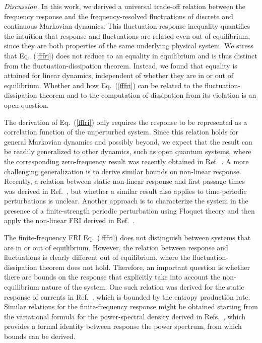 \documentclass[aps,pre,twocolumn,superscriptaddress,notitlepage]{revtex4-2}
\renewcommand{\eqref}[1]{Eq.~(\ref{#1})}
\begin{document}
\textit{Discussion.}
In this work, we derived a universal trade-off relation between the frequency response and the frequency-resolved fluctuations of discrete and continuous Markovian dynamics.
This fluctuation-response inequality quantifies the intuition that response and fluctuations are related even out of equilibrium, since they are both properties of the same underlying physical system.
We stress that \eqref{fffri} does not reduce to an equality in equilibrium and is thus distinct from the fluctuation-dissipation theorem.
Instead, we found that equality is attained for linear dynamics, independent of whether they are in or out of equilibrium.
Whether and how \eqref{fffri} can be related to the fluctuation-dissipation theorem and to the computation of dissipation from its violation \cite{Harada2005,Harada2006} is an open question.

The derivation of \eqref{fffri} only requires the response to be represented as a correlation function of the unperturbed system.
Since this relation holds for general Markovian dynamics and possibly beyond, we expect that the result can be readily generalized to other dynamics, such as open quantum systems, where the corresponding zero-frequency result was recently obtained in Ref.~\cite{VanVu2025}.
A more challenging generalization is to derive similar bounds on non-linear response.
Recently, a relation between static non-linear response and first passage times was derived in Ref.~\cite{Bao2025}, but whether a similar result also applies to time-periodic perturbations is unclear.
Another approach is to characterize the system in the presence of a finite-strength periodic perturbation using Floquet theory and then apply the non-linear FRI derived in Ref.~\cite{Dechant2020}.

The finite-frequency FRI \eqref{fffri} does not distinguish between systems that are in or out of equilibrium.
However, the relation between response and fluctuations is clearly different out of equilibrium, where the fluctuation-dissipation theorem does not hold.
Therefore, an important question is whether there are bounds on the response that explicitly take into account the non-equilibrium nature of the system.
One such relation was derived for the static response of currents in Ref.~\cite{Ptaszynski2024}, which is bounded by the entropy production rate.
Similar relations for the finite-frequency response might be obtained starting from the variational formula for the power-spectral density derived in Refs.~\cite{Dechant2023a,Vo2025}, which provides a formal identity between response the power spectrum, from which bounds can be derived.
\end{document}

